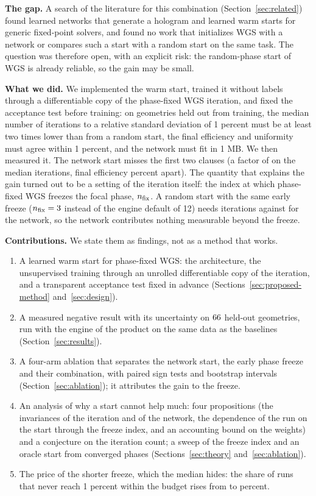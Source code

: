 \textbf{The gap.} A search of the literature for this combination (Section~\ref{sec:related}) found learned networks that generate a hologram and learned warm starts for generic fixed-point
solvers, and found no work that initializes WGS with a network or compares such a start with a random start on the same task. The question was therefore open, with an explicit risk: the
random-phase start of WGS is already reliable, so the gain may be small.

\textbf{What we did.} We implemented the warm start, trained it without labels through a differentiable copy of the phase-fixed WGS iteration, and fixed the acceptance test before training: on geometries held out from
training, the median number of iterations to a relative standard deviation of 1 percent must be at least two times lower than from a random start, the final efficiency and uniformity must agree within 1 percent,
and the network must fit in 1 MB. We then measured it. The network start misses the first two clauses (a factor of \ratioRoverN{} on the median iterations, final efficiency \effdNThree{} percent apart). The quantity that
explains the gain turned out to be a setting of the iteration itself: the index at which phase-fixed WGS freezes the focal phase, $n_{\mathrm{fix}}$. A random start with the same early freeze ($n_{\mathrm{fix}}=3$ instead of
the engine default of 12) needs \itRThree{} iterations against \itNThree{} for the network, so the network contributes nothing measurable beyond the freeze.

\textbf{Contributions.} We state them as findings, not as a method that works.
\begin{enumerate}
\item A learned warm start for phase-fixed WGS: the architecture, the unsupervised training through an unrolled differentiable copy of the iteration, and a transparent acceptance test fixed in advance (Sections~\ref{sec:proposed-method} and~\ref{sec:design}).
\item A measured negative result with its uncertainty on $66$ held-out geometries, run with the engine of the product on the same data as the baselines (Section~\ref{sec:results}).
\item A four-arm ablation that separates the network start, the early phase freeze and their combination, with paired sign tests and bootstrap intervals (Section~\ref{sec:ablation}); it attributes the gain to the freeze.
\item An analysis of why a start cannot help much: four propositions (the invariances of the iteration and of the network, the dependence of the run on the start through the freeze index, and an accounting bound on the weights) and a conjecture on the iteration count; a sweep of the freeze index and an oracle start from converged phases
(Sections~\ref{sec:theory} and~\ref{sec:ablation}).
\item The price of the shorter freeze, which the median hides: the share of runs that never reach 1 percent within the budget rises from \neverRTwelve{} to \neverRThree{} percent.
\end{enumerate}

